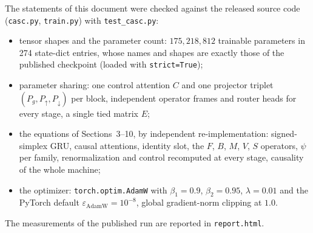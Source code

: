 \documentclass[11pt,a4paper]{article}
\newcommand{\up}{{\uparrow}}
\newcommand{\dn}{{\downarrow}}
\begin{document}
The statements of this document were checked against the released source code (\texttt{casc.py},
\texttt{train.py}) with \texttt{test\_casc.py}:
\begin{itemize}
\item tensor shapes and the parameter count: $175{,}218{,}812$ trainable parameters in 274 state-dict
entries, whose names and shapes are exactly those of the published checkpoint (loaded with
\texttt{strict=True});
\item parameter sharing: one control attention $C$ and one projector triplet $(P_g,P_\up,P_\dn)$ per
block, independent operator frames and router heads for every stage, a single tied matrix $E$;
\item the equations of Sections~3--10, by independent re-implementation: signed-simplex GRU, causal
attentions, identity slot, the $F$, $B$, $M$, $V$, $S$ operators, $\psi$ per family, renormalization and
control recomputed at every stage, causality of the whole machine;
\item the optimizer: \texttt{torch.optim.AdamW} with $\beta_1=0.9$, $\beta_2=0.95$, $\lambda=0.01$ and the
PyTorch default $\varepsilon_{\mathrm{AdamW}}=10^{-8}$, global gradient-norm clipping at $1.0$.
\end{itemize}
The measurements of the published run are reported in \texttt{report.html}.
\end{document}
